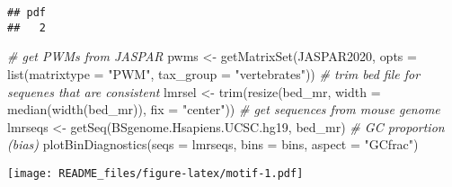 \documentclass[
  10pt,
]{article}
\newenvironment{Shaded}{\begin{snugshade}}{\end{snugshade}}
\newcommand{\AttributeTok}[1]{\textcolor[rgb]{0.77,0.63,0.00}{#1}}
\newcommand{\CommentTok}[1]{\textcolor[rgb]{0.56,0.35,0.01}{\textit{#1}}}
\newcommand{\DecValTok}[1]{\textcolor[rgb]{0.00,0.00,0.81}{#1}}
\newcommand{\FloatTok}[1]{\textcolor[rgb]{0.00,0.00,0.81}{#1}}
\newcommand{\FunctionTok}[1]{\textcolor[rgb]{0.00,0.00,0.00}{#1}}
\newcommand{\NormalTok}[1]{#1}
\newcommand{\OtherTok}[1]{\textcolor[rgb]{0.56,0.35,0.01}{#1}}
\newcommand{\SpecialCharTok}[1]{\textcolor[rgb]{0.00,0.00,0.00}{#1}}
\newcommand{\StringTok}[1]{\textcolor[rgb]{0.31,0.60,0.02}{#1}}
\begin{document}
\begin{Shaded}
\end{Shaded}

\begin{verbatim}
## pdf 
##   2
\end{verbatim}

\begin{Shaded}
\begin{Highlighting}[]
\CommentTok{\# get PWMs from JASPAR}
\NormalTok{pwms }\OtherTok{\textless{}{-}} \FunctionTok{getMatrixSet}\NormalTok{(JASPAR2020,}
                     \AttributeTok{opts =} \FunctionTok{list}\NormalTok{(}\AttributeTok{matrixtype =} \StringTok{"PWM"}\NormalTok{,}
                                 \AttributeTok{tax\_group =} \StringTok{"vertebrates"}\NormalTok{))}
\CommentTok{\# trim bed file for sequenes that are consistent}
\NormalTok{lmrsel }\OtherTok{\textless{}{-}} \FunctionTok{trim}\NormalTok{(}\FunctionTok{resize}\NormalTok{(bed\_mr, }\AttributeTok{width =} \FunctionTok{median}\NormalTok{(}\FunctionTok{width}\NormalTok{(bed\_mr)), }\AttributeTok{fix =} \StringTok{"center"}\NormalTok{))}
\CommentTok{\# get sequences from mouse genome}
\NormalTok{lmrseqs }\OtherTok{\textless{}{-}} \FunctionTok{getSeq}\NormalTok{(BSgenome.Hsapiens.UCSC.hg19, bed\_mr)}
\CommentTok{\# GC proportion (bias)}
\FunctionTok{plotBinDiagnostics}\NormalTok{(}\AttributeTok{seqs =}\NormalTok{ lmrseqs, }\AttributeTok{bins =}\NormalTok{ bins, }\AttributeTok{aspect =} \StringTok{"GCfrac"}\NormalTok{)}
\end{Highlighting}
\end{Shaded}

\texttt{[image: README\_files/figure-latex/motif-1.pdf]}
\end{document}

